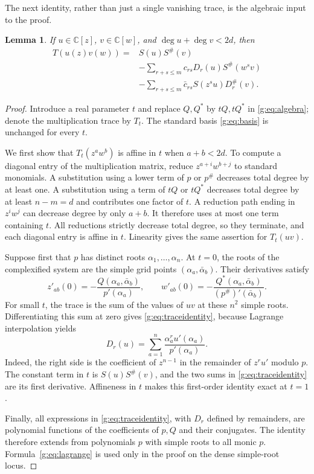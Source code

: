 \documentclass[UTF8,11pt]{ctexart}
\newtheorem{lem}[thm]{Lemma}
\theoremstyle{definition}
\numberwithin{equation}{section}
\newcommand{\C}{\mathbb C}\newcommand{\R}{\mathbb R}
\begin{document}
The next identity, rather than just a single vanishing trace, is the
algebraic input to the proof.
\begin{lem}\label{g:lem:traceidentity}
If $u\in\C[z]$, $v\in\C[w]$, and $\deg u+\deg v<2d$, then
\begin{equation}\label{g:eq:traceidentity}
\begin{split}
 T(u(z)v(w))={}&S(u)S^\#(v)\\
 &-\sum_{r+s\le m}c_{rs}D_r(u)S^\#(w^s v)\\
 &-\sum_{r+s\le m}\bar c_{rs}S(z^s u)D_r^\#(v).
\end{split}
\end{equation}
\end{lem}
\begin{proof}
Introduce a real parameter $t$ and replace $Q,Q^*$ by $tQ,tQ^*$ in
\eqref{g:eq:algebra}; denote the multiplication trace by $T_t$. The standard
basis \eqref{g:eq:basis} is unchanged for every $t$.

We first show that $T_t(z^a w^b)$ is affine in $t$ when $a+b<2d$.
To compute a diagonal entry of the multiplication matrix, reduce
$z^{a+i}w^{b+j}$ to standard monomials. A substitution using a lower term
of $p$ or $p^\#$ decreases total degree by at least one. A substitution
using a term of $tQ$ or $tQ^*$ decreases total degree by at least $n-m=d$
and contributes one factor of $t$. A reduction path ending in $z^iw^j$
can decrease degree by only $a+b$. It therefore uses at most one term
containing $t$. All reductions strictly decrease total degree, so they
terminate, and each diagonal entry is affine in $t$. Linearity gives the
same assertion for $T_t(uv)$.

Suppose first that $p$ has distinct roots $\alpha_1,\ldots,\alpha_n$.
At $t=0$, the roots of the complexified system are the simple grid points
$(\alpha_a,\bar\alpha_b)$. Their derivatives satisfy
\[
 z'_{ab}(0)=-\frac{Q(\alpha_a,\bar\alpha_b)}{p'(\alpha_a)},\qquad
 w'_{ab}(0)=-\frac{Q^*(\alpha_a,\bar\alpha_b)}{(p^\#)'(\bar\alpha_b)}.
\]
For small $t$, the trace is the sum of the values of $uv$ at these
$n^2$ simple roots. Differentiating this sum at zero gives
\eqref{g:eq:traceidentity}, because Lagrange interpolation yields
\begin{equation}\label{g:eq:lagrange}
 D_r(u)=\sum_{a=1}^n
 \frac{\alpha_a^r u'(\alpha_a)}{p'(\alpha_a)}.
\end{equation}
Indeed, the right side is the coefficient of $z^{n-1}$ in the remainder of
$z^ru'$ modulo $p$. The constant term in $t$ is $S(u)S^\#(v)$, and the two
sums in \eqref{g:eq:traceidentity} are its first derivative. Affineness in $t$
makes this first-order identity exact at $t=1$.

Finally, all expressions in \eqref{g:eq:traceidentity}, with $D_r$ defined by
remainders, are polynomial functions of the coefficients of $p,Q$ and
their conjugates. The identity therefore extends from polynomials $p$ with
simple roots to all monic $p$. Formula~\eqref{g:eq:lagrange} is used only in
the proof on the dense simple-root locus.
\end{proof}
\end{document}
